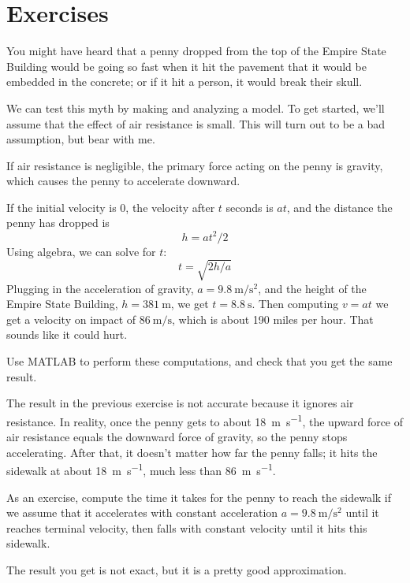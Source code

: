\documentclass[
]{book}
\numberwithin{Answer}{chapter}
\numberwithin{Exercise}{chapter}
\begin{document}
\section{Exercises}

\newenvironment{ex}{\begin{Exercise}}{\end{Exercise}}

\begin{ex}
\label{penny}
You might have heard that a penny dropped from the top of the Empire State Building would be going so fast when it hit the pavement that it would be embedded in the concrete; or if it hit a person, it would break their skull.


We can test this myth by making and analyzing a model.  To get started, we'll assume that the effect of air resistance is small.  This will turn out to be a bad assumption, but bear with me.

If air resistance is negligible, the primary force acting on the penny is gravity, which causes the penny to accelerate downward.


If the initial velocity is 0, the velocity after $t$ seconds is $a t$, and the distance the penny has dropped is
%
\[ h = a t^2 / 2 \]
%
Using algebra, we can solve for $t$:
%
\[ t = \sqrt{ 2 h / a} \]
%
Plugging in the acceleration of gravity, 
$a = \SI{9.8}{\meter\per\second\squared}$, and the height of the Empire State Building, 
$h = \SI{381}{\meter}$, we get 
$t = \SI{8.8}{\second}$.  
Then computing $v = a t$ we get a velocity on impact of $\SI{86}{\meter\per\second}$, which is about 190 miles per hour.  That sounds like it could hurt.

Use MATLAB to perform these computations, and check that you get the same result.
\end{ex}

\begin{ex}
The result in the previous exercise is not accurate because it ignores air resistance.  In reality, once the penny gets to about \SI{18}{\meter\per\second}, the upward force of air resistance equals the downward force of gravity, so the penny stops accelerating.  After that, it doesn't matter how far the penny falls; it hits the sidewalk at about \SI{18}{\meter\per\second}, much less than \SI{86}{\meter\per\second}.

As an exercise, compute the time it takes for the penny to reach the sidewalk if we assume that it accelerates with constant acceleration
$a = \SI{9.8}{\meter\per\second\squared}$ until it reaches terminal velocity, then falls with constant velocity until it hits this sidewalk.

The result you get is not exact, but it is a pretty good approximation.

\end{ex}
\end{document}
